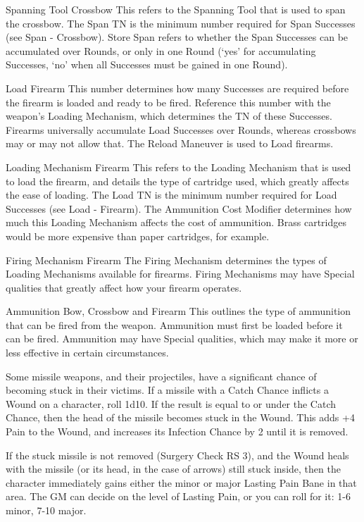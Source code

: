 \documentclass[oneside,11pt,english]{book}
\begin{document}
 

Spanning Tool 
Crossbow 
This refers to the Spanning Tool that is used to span the crossbow. The Span TN is the minimum number 
required for Span Successes (see Span - Crossbow). Store Span refers to whether the Span Successes can 
be accumulated over Rounds, or only in one Round (‘yes’ for accumulating Successes, ‘no’ when all 
Successes must be gained in one Round). 


 

Load 
Firearm 
This number determines how many Successes are required before the firearm is loaded and ready to be 
fired. Reference this number with the weapon’s Loading Mechanism, which determines the TN of these 
Successes. Firearms universally accumulate Load Successes over Rounds, whereas crossbows may or 
may not allow that. The Reload Maneuver is used to Load firearms. 

 

Loading Mechanism 
Firearm 
This refers to the Loading Mechanism that is used to load the firearm, and details the type of cartridge 
used, which greatly affects the ease of loading. The Load TN is the minimum number required for Load 
Successes (see Load - Firearm). The Ammunition Cost Modifier determines how much this Loading 
Mechanism affects the cost of ammunition. Brass cartridges would be more expensive than paper 
cartridges, for example. 
 


Firing Mechanism 
Firearm 
The Firing Mechanism determines the types of Loading Mechanisms available for firearms. Firing 
Mechanisms may have Special qualities that greatly affect how your firearm operates. 
 
Ammunition 
Bow, Crossbow and Firearm 
This outlines the type of ammunition that can be fired from the weapon. Ammunition must first be loaded 
before it can be fired. Ammunition may have Special qualities, which may make it more or less effective 
in certain circumstances. 

 

Some missile weapons, and their projectiles, have a significant chance of becoming stuck in their victims. 
If a missile with a Catch Chance inflicts a Wound on a character, roll 1d10. If the result is equal to or 
under the Catch Chance, then the head of the missile becomes stuck in the Wound. This adds +4 Pain to 
the Wound, and increases its Infection Chance by 2 until it is removed. 

 

If the stuck missile is not removed (Surgery Check RS 3), and the Wound heals with the missile (or its 
head, in the case of arrows) still stuck inside, then the character immediately gains either the minor or 
major Lasting Pain Bane in that area. The GM can decide on the level of Lasting Pain, or you can roll for 
it: 1-6 minor, 7-10 major. 
\end{document}
